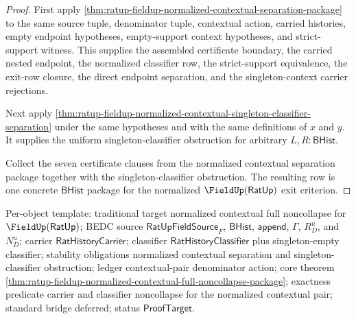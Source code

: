 \begin{proof}
First apply
\autoref{thm:ratup-fieldup-normalized-contextual-separation-package} to the
same source tuple, denominator tuple, contextual action, carried histories,
empty endpoint hypotheses, empty-support context hypotheses, and strict-support
witness. This supplies the assembled certificate boundary, the carried nested
endpoint, the normalized classifier row, the strict-support equivalence, the
exit-row closure, the direct endpoint separation, and the singleton-context
carrier rejections.

Next apply
\autoref{thm:ratup-fieldup-normalized-contextual-singleton-classifier-separation}
under the same hypotheses and with the same definitions of $x$ and $y$. It
supplies the uniform singleton-classifier obstruction for arbitrary
$L,R:\mathsf{BHist}$.

Collect the seven certificate clauses from the normalized contextual separation
package together with the singleton-classifier obstruction. The resulting row
is one concrete $\mathsf{BHist}$ package for the normalized
$\FieldUp(\mathsf{RatUp})$ exit criterion.
\end{proof}

Per-object template: traditional target normalized contextual full noncollapse
for $\FieldUp(\mathsf{RatUp})$; BEDC source $\mathsf{RatUpFieldSource}_F$,
$\mathsf{BHist}$, $\mathsf{append}$, $\Gamma$, $R_D^u$, and $N_D^u$; carrier
$\mathsf{RatHistoryCarrier}$; classifier $\mathsf{RatHistoryClassifier}$ plus
singleton-empty classifier; stability obligations normalized contextual
separation and singleton-classifier obstruction; ledger contextual-pair
denominator action; core theorem
\autoref{thm:ratup-fieldup-normalized-contextual-full-noncollapse-package};
exactness predicate carrier and classifier noncollapse for the normalized
contextual pair; standard bridge deferred; status $\mathsf{ProofTarget}$.

